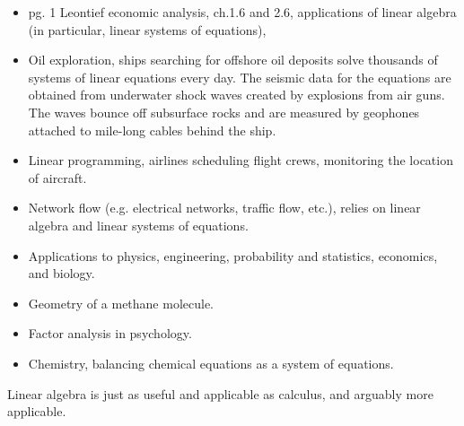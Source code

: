 \documentclass[letterpaper,12pt]{article}
\theoremstyle{definition}
\begin{document}
\begin{itemize}
    \item pg. 1 Leontief economic analysis, ch.1.6 and 2.6, applications of linear algebra (in particular, linear systems of equations), 
    \item Oil exploration, ships searching for offshore oil deposits solve thousands of systems of linear equations every day. The seismic data for the equations are obtained from underwater shock waves created by explosions from air guns. The waves bounce off subsurface rocks and are measured by geophones attached to mile-long cables behind the ship. 
    \item Linear programming, airlines scheduling flight crews, monitoring the location of aircraft.
    \item Network flow (e.g. electrical networks, traffic flow, etc.), relies on linear algebra and linear systems of equations.
    \item Applications to physics, engineering, probability and statistics, economics, and biology.
    \item Geometry of a methane molecule.
    \item Factor analysis in psychology.
    \item Chemistry, balancing chemical equations as a system of equations.
\end{itemize}


Linear algebra is just as useful and applicable as calculus, and arguably more applicable.
\end{document}

